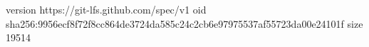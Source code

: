 version https://git-lfs.github.com/spec/v1
oid sha256:9956ecf8f72f8cc864de3724da585c24c2cb6e97975537af55723da00e24101f
size 19514
